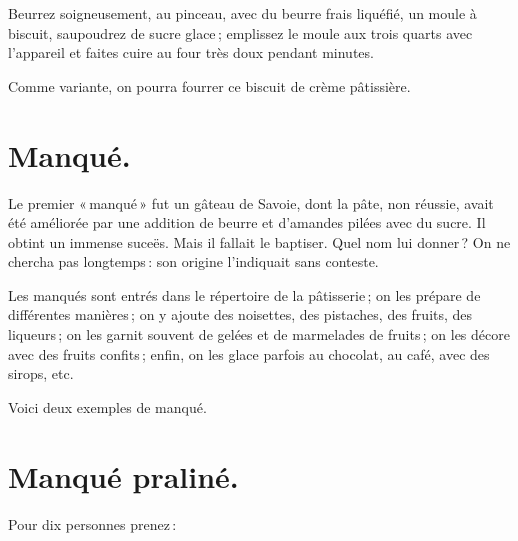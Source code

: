 Beurrez soigneusement, au pinceau, avec du beurre frais liquéfié, un moule
à biscuit, saupoudrez de sucre glace ; emplissez le moule aux trois quarts avec
l'appareil et faites cuire au four très doux pendant {\mmm} minutes.

\sk

Comme variante, on pourra fourrer ce biscuit de crème pâtissière.

\section*{\centering Manqué.}
{}

Le premier « manqué » fut un gâteau de Savoie, dont la pâte, non réussie,
avait été améliorée par une addition de beurre et d'amandes pilées avec du sucre.
Il obtint un immense suceës. Mais il fallait le baptiser. Quel nom lui donner ?
On ne chercha pas longtemps : son origine l'indiquait sans conteste.

Les manqués sont entrés dans le répertoire de la pâtisserie ; on les prépare de
différentes manières ; on y ajoute des noisettes, des pistaches, des fruits,
des liqueurs ; on les garnit souvent de gelées et de marmelades de fruits ; on
les décore avec des fruits confits ; enfin, on les glace parfois au chocolat,
au café, avec des sirops, etc.

\medskip

Voici deux exemples de manqué.

\section*{\centering Manqué praliné.}
{}

Pour dix personnes prenez :

